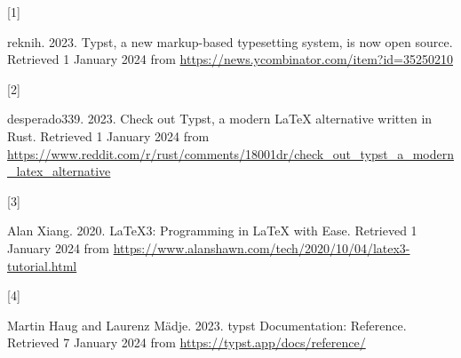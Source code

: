 \documentclass[
  a4paper,
]{article}
\newlength{\cslhangindent}
\newlength{\csllabelwidth}
\newenvironment{CSLReferences}[2] %
 {\begin{list}{}{%
  \setlength{\itemindent}{0pt}
  \setlength{\leftmargin}{0pt}
  \setlength{\parsep}{0pt}
  \ifodd #1
   \setlength{\leftmargin}{\cslhangindent}
   \setlength{\itemindent}{-1\cslhangindent}
  \fi
  \setlength{\itemsep}{#2\baselineskip}}}
 {\end{list}}
\newcommand{\CSLLeftMargin}[1]{\parbox[t]{\csllabelwidth}{\strut#1\strut}}
\newcommand{\CSLRightInline}[1]{\parbox[t]{\linewidth - \csllabelwidth}{\strut#1\strut}}
\begin{document}
\label{refs}
\begin{CSLReferences}{0}{0}
\CSLLeftMargin{{[}1{]} }%
\CSLRightInline{reknih. 2023. {Typst, a new markup-based typesetting
system, is now open source}. Retrieved 1 January 2024 from
\url{https://news.ycombinator.com/item?id=35250210}}

\CSLLeftMargin{{[}2{]} }%
\CSLRightInline{desperado339. 2023. {Check out Typst, a modern LaTeX
alternative written in Rust}. Retrieved 1 January 2024 from
\url{https://www.reddit.com/r/rust/comments/18001dr/check_out_typst_a_modern_latex_alternative}}

\CSLLeftMargin{{[}3{]} }%
\CSLRightInline{Alan Xiang. 2020. {LaTeX3: Programming in LaTeX with
Ease}. Retrieved 1 January 2024 from
\url{https://www.alanshawn.com/tech/2020/10/04/latex3-tutorial.html}}

\CSLLeftMargin{{[}4{]} }%
\CSLRightInline{Martin Haug and Laurenz Mädje. 2023. {typst
Documentation: Reference}. Retrieved 7 January 2024 from
\url{https://typst.app/docs/reference/}}

\end{CSLReferences}
\end{document}
